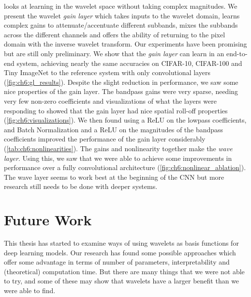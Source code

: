\textbf{} looks at learning in the wavelet space without
taking complex magnitudes. We present the wavelet \emph{gain layer} which takes
inputs to the wavelet domain, learns complex gains to attenuate/accentuate
different subbands, mixes the subbands across the different channels and offers
the ability of returning to the pixel domain with the inverse wavelet transform.
Our experiments have been promising but are still only preliminary. We 
show that the \emph{gain layer} can learn in an end-to-end system, achieving nearly
the same accuracies on CIFAR-10, CIFAR-100 and Tiny ImageNet to the reference system with
only convolutional layers (\autoref{fig:ch6:gl_results}).
Despite the slight reduction in performance, we saw some
nice properties of the gain layer. The bandpass gains were very sparse, 
needing very few non-zero coefficients and visualizations of what the layers
were responding to showed that the gain layer had nice
spatial roll-off properties (\autoref{fig:ch6:visualizations}).
We then found using a ReLU on the lowpass coefficients, and
Batch Normalization and a ReLU on the magnitudes of the bandpass coefficients
improved the performance of the gain layer considerably (\autoref{tab:ch6:nonlinearities}). 
The gains and nonlinearity together make the \emph{wave layer}. Using this, we
saw that we were able to achieve some improvements in performance over a fully
convolutional architecture (\autoref{fig:ch6:nonlinear_ablation}). The wave
layer seems to work best at the beginning of the CNN but more research still
needs to be done with deeper systems. 

\section{Future Work}
This thesis has started to examine ways of using wavelets as basis functions for
deep learning models. Our research has found some possible approaches 
which offer some advantage in terms of number of parameters, interpretability
and (theoretical) computation time. But there are many things that we were not
able to try, and some of these may show that wavelets have a larger benefit than
we were able to find.

